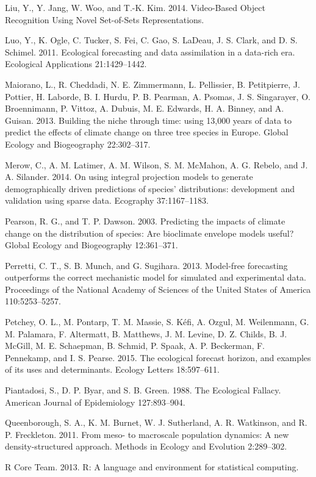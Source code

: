 \documentclass[12pt,]{article}
\begin{document}
Liu, Y., Y. Jang, W. Woo, and T.-K. Kim. 2014. Video-Based Object
Recognition Using Novel Set-of-Sets Representations.

Luo, Y., K. Ogle, C. Tucker, S. Fei, C. Gao, S. LaDeau, J. S. Clark, and
D. S. Schimel. 2011. Ecological forecasting and data assimilation in a
data-rich era. Ecological Applications 21:1429--1442.

Maiorano, L., R. Cheddadi, N. E. Zimmermann, L. Pellissier, B.
Petitpierre, J. Pottier, H. Laborde, B. I. Hurdu, P. B. Pearman, A.
Psomas, J. S. Singarayer, O. Broennimann, P. Vittoz, A. Dubuis, M. E.
Edwards, H. A. Binney, and A. Guisan. 2013. Building the niche through
time: using 13,000 years of data to predict the effects of climate
change on three tree species in Europe. Global Ecology and Biogeography
22:302--317.

Merow, C., A. M. Latimer, A. M. Wilson, S. M. McMahon, A. G. Rebelo, and
J. A. Silander. 2014. On using integral projection models to generate
demographically driven predictions of species' distributions:
development and validation using sparse data. Ecography 37:1167--1183.

Pearson, R. G., and T. P. Dawson. 2003. Predicting the impacts of
climate change on the distribution of species: Are bioclimate envelope
models useful? Global Ecology and Biogeography 12:361--371.

Perretti, C. T., S. B. Munch, and G. Sugihara. 2013. Model-free
forecasting outperforms the correct mechanistic model for simulated and
experimental data. Proceedings of the National Academy of Sciences of
the United States of America 110:5253--5257.

Petchey, O. L., M. Pontarp, T. M. Massie, S. Kéfi, A. Ozgul, M.
Weilenmann, G. M. Palamara, F. Altermatt, B. Matthews, J. M. Levine, D.
Z. Childs, B. J. McGill, M. E. Schaepman, B. Schmid, P. Spaak, A. P.
Beckerman, F. Pennekamp, and I. S. Pearse. 2015. The ecological forecast
horizon, and examples of its uses and determinants. Ecology Letters
18:597--611.

Piantadosi, S., D. P. Byar, and S. B. Green. 1988. The Ecological
Fallacy. American Journal of Epidemiology 127:893--904.

Queenborough, S. A., K. M. Burnet, W. J. Sutherland, A. R. Watkinson,
and R. P. Freckleton. 2011. From meso- to macroscale population
dynamics: A new density-structured approach. Methods in Ecology and
Evolution 2:289--302.

R Core Team. 2013. R: A language and environment for statistical
computing.
\end{document}
